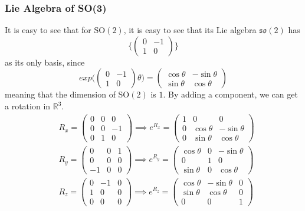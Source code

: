 \documentclass{article}
\theoremstyle{remark}
\theoremstyle{definition}
\begin{document}
\subsubsection{Lie Algebra of SO(3)}
It is easy to see that for SO$(2)$, it is easy to see that its Lie algebra $\mathfrak{so}(2)$ has 
\[\bigg\{ \begin{pmatrix}
0&-1\\1&0
\end{pmatrix}\bigg\}\]
as its only basis, since 
\[exp  \bigg( \begin{pmatrix}
0&-1\\1&0
\end{pmatrix} \theta \bigg) = \begin{pmatrix}
\cos{\theta} & - \sin{\theta} \\
\sin{\theta} & \cos{\theta}
\end{pmatrix}\]
meaning that the dimension of SO$(2)$ is $1$. By adding a component, we can get a rotation in $\mathbb{R}^3$. 
\begin{align*}
    & R_x = \begin{pmatrix}0&0&0\\0&0&-1\\0&1&0\end{pmatrix} \implies e^{R_x} = \begin{pmatrix}
    1&0&0\\ 0&\cos{\theta}&-\sin{\theta}\\0&\sin{\theta}&\cos{\theta}
    \end{pmatrix}\\
    & R_y = \begin{pmatrix}0&0&1\\0&0&0\\-1&0&0\end{pmatrix} \implies e^{R_y} = \begin{pmatrix}
    \cos{\theta} & 0 & -\sin{\theta}\\ 0&1&0 \\
    \sin{\theta}& 0 & \cos{\theta} \end{pmatrix} \\
    & R_z = \begin{pmatrix}0&-1&0\\1&0&0\\0&0&0\end{pmatrix} \implies e^{R_z} = \begin{pmatrix}
    \cos{\theta} & -\sin{\theta} & 0\\
    \sin{\theta}& \cos{\theta} & 0 \\ 0 & 0 & 1\end{pmatrix}
\end{align*}
\end{document}

